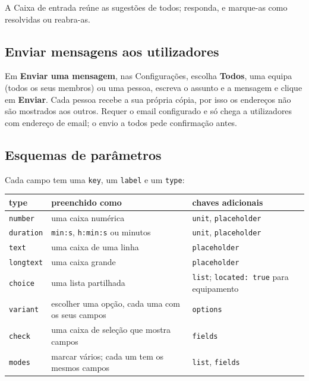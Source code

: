 \documentclass[11pt,a4paper]{article}
\newcommand{\ui}[1]{\textsf{\textbf{#1}}}
\newcommand{\menu}[1]{\textsf{#1}}
\begin{document}
A \menu{Caixa de entrada} reúne as sugestões de todos; responda, e
marque-as como resolvidas ou reabra-as.

\subsection{Enviar mensagens aos utilizadores}

Em \ui{Enviar uma mensagem}, nas \menu{Configurações}, escolha \ui{Todos}, uma
equipa (todos os seus membros) ou uma pessoa, escreva o assunto e a mensagem e clique em \ui{Enviar}. Cada
pessoa recebe a sua própria cópia, por isso os endereços não são mostrados
aos outros. Requer o email configurado e só chega a utilizadores com
endereço de email; o envio a todos pede confirmação antes.

\subsection{Esquemas de parâmetros}

Cada campo tem uma \texttt{key}, um \texttt{label} e um \texttt{type}:

\begin{center}
\small
\begin{tabularx}{\linewidth}{@{}l>{\raggedright}p{4.6cm}X@{}}
\toprule
\textbf{type} & \textbf{preenchido como} & \textbf{chaves adicionais} \\
\midrule
\texttt{number}   & uma caixa numérica & \texttt{unit}, \texttt{placeholder} \\
\texttt{duration} & \texttt{min:s}, \texttt{h:min:s} ou minutos & \texttt{unit}, \texttt{placeholder} \\
\texttt{text}     & uma caixa de uma linha & \texttt{placeholder} \\
\texttt{longtext} & uma caixa grande & \texttt{placeholder} \\
\texttt{choice}   & uma lista partilhada & \texttt{list}; \texttt{located: true} para equipamento \\
\texttt{variant}  & escolher uma opção, cada uma com os seus campos & \texttt{options} \\
\texttt{check}    & uma caixa de seleção que mostra campos & \texttt{fields} \\
\texttt{modes}    & marcar vários; cada um tem os mesmos campos & \texttt{list}, \texttt{fields} \\
\bottomrule
\end{tabularx}
\end{center}
\end{document}
